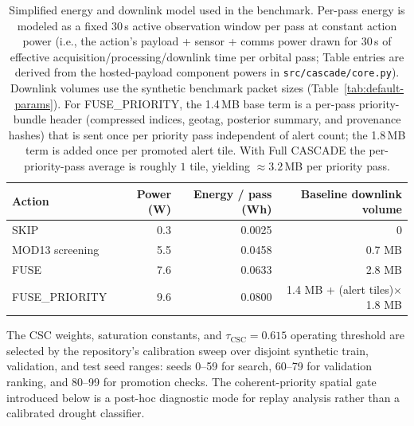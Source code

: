 \documentclass[11pt]{article}
\begin{document}
\begin{table}[H]
\centering
\caption{Simplified energy and downlink model used in the benchmark. Per-pass energy is modeled as a fixed 30\,s active observation window per pass at constant action power (i.e., the action's payload + sensor + comms power drawn for 30\,s of effective acquisition/processing/downlink time per orbital pass; Table entries are derived from the hosted-payload component powers in \texttt{src/cascade/core.py}). Downlink volumes use the synthetic benchmark packet sizes (Table~\ref{tab:default-params}). For FUSE\_PRIORITY, the 1.4\,MB base term is a per-pass priority-bundle header (compressed indices, geotag, posterior summary, and provenance hashes) that is sent once per priority pass independent of alert count; the 1.8\,MB term is added once per promoted alert tile. With Full CASCADE the per-priority-pass average is roughly $1$ tile, yielding $\approx 3.2$\,MB per priority pass.}
\label{tab:energy-model}
\begin{tabular}{lrrr}
\toprule
Action & Power (W) & Energy / pass (Wh) & Baseline downlink volume \\
\midrule
SKIP & 0.3 & 0.0025 & 0 \\
MOD13 screening & 5.5 & 0.0458 & 0.7 MB \\
FUSE & 7.6 & 0.0633 & 2.8 MB \\
FUSE\_PRIORITY & 9.6 & 0.0800 & 1.4 MB + (alert tiles)$\times$1.8 MB \\
\bottomrule
\end{tabular}
\end{table}

The CSC weights, saturation constants, and $\tau_\mathrm{CSC}=0.615$ operating threshold are selected by the repository's calibration sweep over disjoint synthetic train, validation, and test seed ranges: seeds 0--59 for search, 60--79 for validation ranking, and 80--99 for promotion checks. The coherent-priority spatial gate introduced below is a post-hoc diagnostic mode for replay analysis rather than a calibrated drought classifier.
\end{document}

